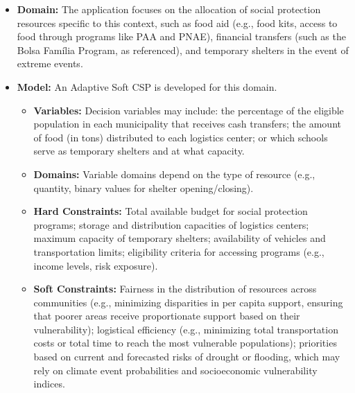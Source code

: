 \begin{itemize}
    \item \textbf{Domain:} The application focuses on the allocation of social protection resources specific to this context, such as food aid (e.g., food kits, access to food through programs like PAA and PNAE), financial transfers (such as the Bolsa Família Program, as referenced), and temporary shelters in the event of extreme events.

    \item \textbf{Model:} An Adaptive Soft CSP is developed for this domain.
    \begin{itemize}
        \item \textbf{Variables:} Decision variables may include: the percentage of the eligible population in each municipality that receives cash transfers; the amount of food (in tons) distributed to each logistics center; or which schools serve as temporary shelters and at what capacity.
        \item \textbf{Domains:} Variable domains depend on the type of resource (e.g., quantity, binary values for shelter opening/closing).
        \item \textbf{Hard Constraints:} Total available budget for social protection programs; storage and distribution capacities of logistics centers; maximum capacity of temporary shelters; availability of vehicles and transportation limits; eligibility criteria for accessing programs (e.g., income levels, risk exposure).
        \item \textbf{Soft Constraints:} Fairness in the distribution of resources across communities (e.g., minimizing disparities in per capita support, ensuring that poorer areas receive proportionate support based on their vulnerability); logistical efficiency (e.g., minimizing total transportation costs or total time to reach the most vulnerable populations); priorities based on current and forecasted risks of drought or flooding, which may rely on climate event probabilities and socioeconomic vulnerability indices.
    \end{itemize}


\end{itemize}
